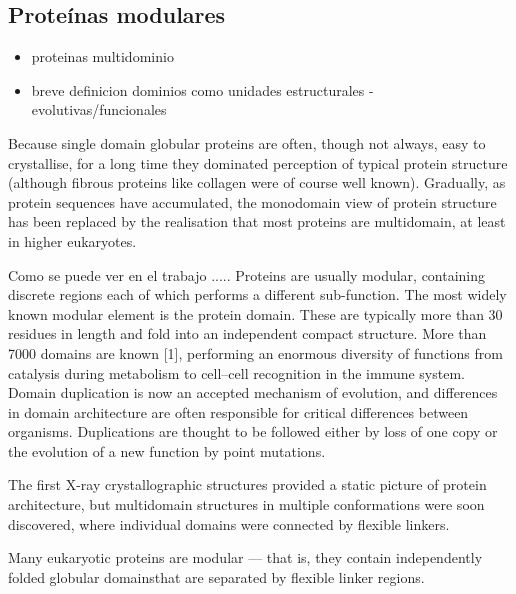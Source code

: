 \subsection{Proteínas modulares}
\begin{itemize}
 \item proteinas multidominio
 \item breve definicion dominios como unidades estructurales - evolutivas/funcionales
\end{itemize}


Because single domain globular proteins are often, though not always, easy to crystallise, for a long time they dominated perception of typical protein structure (although fibrous proteins like collagen were of course well known).
Gradually, as protein
sequences have accumulated, the monodomain view of protein
structure has been replaced by the realisation that most proteins
are multidomain, at least in higher eukaryotes.



Como se puede ver en el trabajo \cite{neduva2005linear}.....
Proteins are usually modular, containing discrete regions each of which performs a different sub-function. 
The most widely known modular element is the protein domain. These are typically more than 30 residues in length and fold into an independent compact structure. 
More than 7000 domains are known [1], performing an enormous diversity of functions from catalysis during metabolism to cell–cell recognition in the
immune system. Domain duplication is now an accepted mechanism of evolution, and differences in domain architecture are often responsible for critical differences between organisms.
Duplications are thought to be followed either by loss of one copy or the evolution of a new function by point mutations.













The first X-ray crystallographic structures provided a static picture of protein architecture, but multidomain structures in multiple conformations were soon discovered, where individual domains were connected by flexible linkers.

Many eukaryotic proteins are modular — that is, they contain independently folded globular domainsthat are separated by flexible linker regions. 

